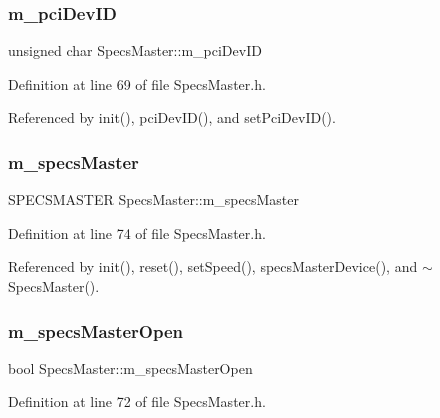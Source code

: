 \subsubsection{\texorpdfstring{m\+\_\+pci\+Dev\+ID}{m\_pciDevID}}
{\footnotesize\ttfamily unsigned char Specs\+Master\+::m\+\_\+pci\+Dev\+ID\hspace{0.3cm}{\ttfamily [private]}}



Definition at line 69 of file Specs\+Master.\+h.



Referenced by init(), pci\+Dev\+I\+D(), and set\+Pci\+Dev\+I\+D().

\mbox{\label{classSpecsMaster_a32497dbb9887b6c546113135f3acc6b1}} 
\subsubsection{\texorpdfstring{m\+\_\+specs\+Master}{m\_specsMaster}}
{\footnotesize\ttfamily S\+P\+E\+C\+S\+M\+A\+S\+T\+ER Specs\+Master\+::m\+\_\+specs\+Master\hspace{0.3cm}{\ttfamily [private]}}



Definition at line 74 of file Specs\+Master.\+h.



Referenced by init(), reset(), set\+Speed(), specs\+Master\+Device(), and $\sim$\+Specs\+Master().

\mbox{\label{classSpecsMaster_aff461467e5aa5fdc853bfeecbd722db4}} 
\subsubsection{\texorpdfstring{m\+\_\+specs\+Master\+Open}{m\_specsMasterOpen}}
{\footnotesize\ttfamily bool Specs\+Master\+::m\+\_\+specs\+Master\+Open\hspace{0.3cm}{\ttfamily [private]}}



Definition at line 72 of file Specs\+Master.\+h.



